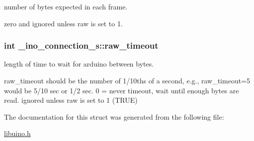number of bytes expected in each frame. 

zero and ignored unless raw is set to 1. \hypertarget{struct__ino__connection__s_a84d5f96f8956f9a9f24f33ddf1734004}{
\subsubsection[{raw\-\_\-timeout}]{\setlength{\rightskip}{0pt plus 5cm}int {\bf \-\_\-ino\-\_\-connection\-\_\-s\-::raw\-\_\-timeout}}}\label{struct__ino__connection__s_a84d5f96f8956f9a9f24f33ddf1734004}


length of time to wait for arduino between bytes. 

raw\-\_\-timeout should be the number of 1/10ths of a second, e.\-g., raw\-\_\-timeout=5 would be 5/10 sec or 1/2 sec. 0 = never timeout, wait until enough bytes are read. ignored unless raw is set to 1 (\-T\-R\-U\-E) 

\-The documentation for this struct was generated from the following file\-:\begin{DoxyCompactItemize}
\item 
\hyperlink{libuino_8h}{libuino.\-h}\end{DoxyCompactItemize}
